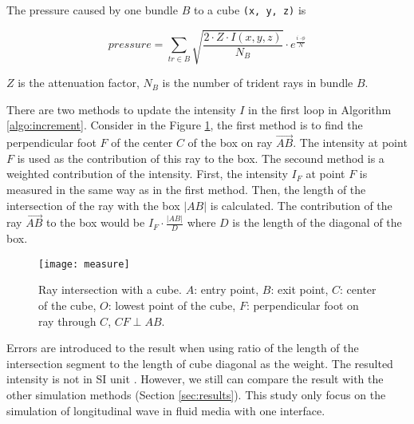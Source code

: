 The pressure caused by one bundle $B$ to a cube \texttt{(x, y, z)} is

\begin{equation} \label{eq:sum_pressure}
    pressure = \sum_{tr\in B} \sqrt{\frac{2\cdot Z\cdot I(x,y,z)}{N_B}} \cdot e^{\frac{i\cdot\phi}{N}}
\end{equation}

$Z$ is the attenuation factor, $N_B$ is the number of trident rays in bundle $B$.

There are two methods to update the intensity $I$ in the first loop in Algorithm \ref{algo:increment}. Consider in the Figure \ref{fig:measure}, the first method is to find the perpendicular foot $F$ of the center $C$ of the box on ray $\vec{AB}$. The intensity at point $F$ is used as the contribution of this ray to the box. The secound method is a weighted contribution of the intensity. First, the intensity $I_F$ at point $F$ is measured in the same way as in the first method. Then, the length of the intersection of the ray with the box $|AB|$ is calculated. The contribution of the ray $\vec{AB}$ to the box would be $I_F \cdot \frac{|AB|}{D}$ where $D$ is the length of the diagonal of the box.

\begin{figure}[h]
    \centering
    \texttt{[image: measure]}
    \caption{Ray intersection with a cube. $A$: entry point, $B$: exit point, $C$: center of the cube, $O$: lowest point of the cube, $F$: perpendicular foot on ray through $C$, $CF \perp AB$.}
    \label{fig:measure}
\end{figure}

Errors are introduced to the result when using ratio of the length of the intersection segment to the length of cube diagonal as the weight. The resulted intensity is not in SI unit \cite{unitscale}. However, we still can compare the result with the other simulation methods (Section \ref{sec:results}). This study only focus on the simulation of longitudinal wave in fluid media with one interface.



